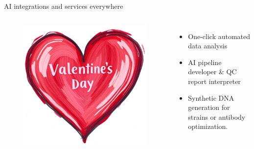 \documentclass[10pt]{beamer}
\begin{document}
\begin{frame}{AI integrations and services everywhere}
	\begin{columns}[T,onlytextwidth]
		\hspace*{-1.1cm} 
		\begin{figure}
			\includegraphics[width=\textwidth]{figures/Valentine_s_Day_gift_card_square.png}
		\end{figure}
		\begin{itemize}
			\item One-click automated data analysis
			\item AI pipeline developer \& QC report interpreter
			\item Synthetic DNA generation for strains or antibody optimization. 
		\end{itemize}
	\vspace{0.3cm} 
	\end{columns}
	\begin{columns}[T,onlytextwidth]
		\hspace*{-1.1cm} 
		\begin{figure}

\end{figure}
\end{columns}
\end{frame}
\end{document}
